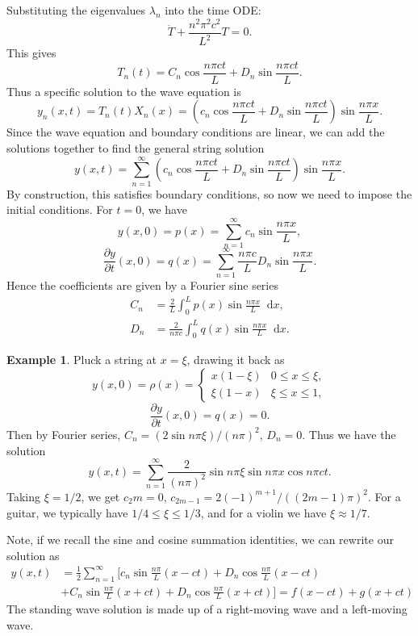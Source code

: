 \documentclass[12pt]{article}
\newcommand{\diff}{\mathop{}\!\mathrm{d}}
\theoremstyle{definition}
\newtheorem{example}{Example}[section]
\theoremstyle{remark}
\begin{document}
Substituting the eigenvalues $\lambda_n$ into the time ODE:
\[
\ddot T + \frac{n^2 \pi^2 c^2}{L^2} T = 0
.\]
This gives
\[
	T_n(t) = C_n \cos \frac{n \pi ct}{L} + D_n \sin \frac{n \pi ct}{L}
.\]
Thus a specific solution to the wave equation is
\[
	y_n(x, t) = T_n(t)X_n(x) = \left(c_n \cos \frac{n \pi ct}{L} + D_n \sin \frac{n \pi ct}{L} \right) \sin \frac{n \pi x}{L}
.\]
Since the wave equation and boundary conditions are linear, we can add the solutions together to find the general string solution
\[
	y(x, t) = \sum_{n = 1}^{\infty} \left( c_n \cos \frac{n \pi ct}{L} + D_n \sin \frac{n \pi ct}{L} \right) \sin \frac{n \pi x}{L}
.\]
By construction, this satisfies boundary conditions, so now we need to impose the initial conditions. For $t = 0$, we have
\[
	y(x, 0) = p(x) = \sum_{n = 1}^{\infty} c_n \sin \frac{n \pi x}{L}
,\]
\[
	\frac{\partial y}{\partial t}(x, 0) = q(x) = \sum_{n = 1}^{\infty} \frac{n \pi c}{L} D_n \sin \frac{n \pi x}{L}
.\]
Hence the coefficients are given by a Fourier sine series
\begin{align*}
	C_n &= \frac{2}{L} \int_{0}^{L}p(x) \sin \frac{n \pi x}{L} \diff x, \\
	D_n &= \frac{2}{n \pi c} \int_{0}^{L}q(x) \sin \frac{n \pi x}{L} \diff x.
\end{align*}

\begin{adjustbox}{minipage = \columnwidth - 25.5pt, margin=1em, frame=1pt, margin=0em}
\begin{example}
	Pluck a string at $x = \xi$, drawing it back as
	\[
		y(x, 0) = \rho(x) =
		\begin{cases}
			x(1 - \xi) & 0 \leq x \leq \xi, \\
			\xi(1 - x) & \xi \leq x \leq 1,
		\end{cases}
	\]
	\[
		\frac{\partial y}{\partial t} (x, 0) = q(x) = 0
	.\]
	Then by Fourier series, $C_n = (2 \sin n \pi \xi)/(n \pi)^2$, $D_n = 0$. Thus we have the solution
	\[
		y(x, t) = \sum_{n = 1}^{\infty} \frac{2}{(n \pi)^2} \sin n \pi \xi \sin n \pi x \cos n \pi c t
	.\]
	Taking $\xi = 1/2$, we get $c_2m = 0$, $c_{2m-1} = 2(-1)^{m+1}/((2m-1)\pi)^2$. For a guitar, we typically have $1/4 \leq \xi \leq 1/3$, and for a violin we have $\xi \approx 1/7$.
\end{example}

\end{adjustbox}

Note, if we recall the sine and cosine summation identities, we can rewrite our solution as
\begin{align*}
	y(x, t) &= \frac{1}{2} \sum_{n = 1}^{\infty}\biggl[ c_n \sin \frac{n \pi}{L} (x - ct) + D_n \cos \frac{n \pi}{L} (x - ct) \\
		&+ C_n \sin \frac{n \pi}{L} (x + ct) + D_n \cos \frac{n \pi}{L} (x + ct) \biggr] = f(x - ct) + g(x + ct)
\end{align*}
The standing wave solution is made up of a right-moving wave and a left-moving wave.

\newpage

\printindex
\end{document}
